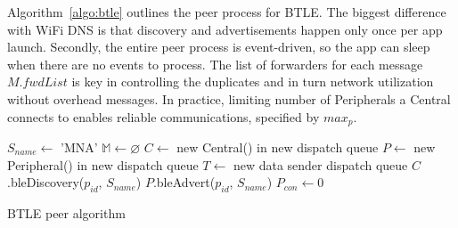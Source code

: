 \documentclass[conference]{IEEEtran}
\begin{document}
Algorithm~\ref{algo:btle} outlines the peer process for BTLE. The
biggest difference with WiFi DNS is that discovery and advertisements
happen only once per app launch. Secondly, the entire peer process is
event-driven, so the app can sleep when there are no events to
process. The list of forwarders for each message $M.fwdList$ is key in
controlling the duplicates and in turn network utilization without
overhead messages. In practice, limiting number of Peripherals a
Central connects to enables reliable communications, specified by
$max_p$.

\begin{algorithm}[htb!]
\label{algo:btle}
\DontPrintSemicolon %
\SetAlgoLined
{}
 $S_{name} \gets$ \textsf{'MNA'}\;
 $\mathbb{M} \gets \varnothing$\;
 $C \gets$ new Central() in new dispatch queue\;
 $P \gets$ new Peripheral() in new dispatch queue\;
 $T \gets$ new data sender dispatch queue\;
 $C$.bleDiscovery($p_{id}$, $S_{name}$)\;
 $P$.bleAdvert($p_{id}$, $S_{name}$)\;
 $P_{con} \gets 0$\;





 \caption{BTLE peer algorithm}
\end{algorithm}
\end{document}
